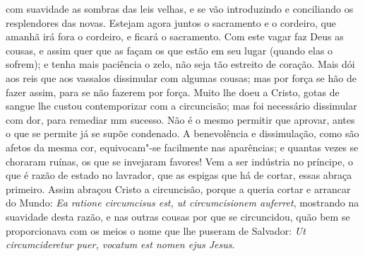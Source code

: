 com suavidade as sombras das leis velhas, e se vão introduzindo e
conciliando os resplendores das novas. Estejam agora juntos o sacramento
e o cordeiro, que amanhã irá fora o cordeiro, e ficará o sacramento. Com
este vagar faz Deus as cousas, e assim quer que as façam os que estão em
seu lugar (quando elas o sofrem); e tenha mais paciência o zelo, não
seja tão estreito de coração. Mais dói aos reis que aos vassalos
dissimular com algumas cousas; mas por força se hão de fazer assim, para
se não fazerem por força. Muito lhe doeu a Cristo, gotas de sangue lhe
custou contemporizar com a circuncisão; mas foi necessário dissimular
com dor, para remediar mm sucesso. Não é o mesmo permitir que aprovar,
antes o que se permite já se supõe condenado. A benevolência e
dissimulação, como são afetos da mesma cor, equivocam"-se facilmente nas
aparências; e quantas vezes se choraram ruínas, os que se invejaram
favores! Vem a ser indústria no príncipe, o que é razão de estado no
lavrador, que as espigas que há de cortar, essas abraça primeiro. Assim
abraçou Cristo a circuncisão, porque a queria cortar e arrancar do
Mundo: \emph{Ea ratione circumcisus est, ut circumcisionem auferret},
mostrando na suavidade desta razão, e nas outras cousas por que se
circuncidou, quão bem se proporcionava com os meios o nome que lhe
puseram de Salvador: \emph{Ut circumcideretur puer, vocatum est nomen
ejus Jesus}.

